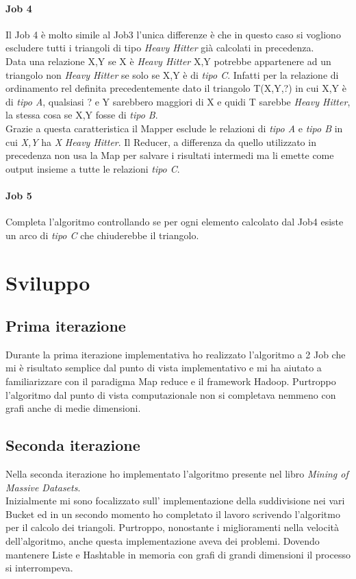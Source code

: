 \documentclass[paper=a4, fontsize=11pt]{scrartcl}	%
\numberwithin{equation}{section}															%
\numberwithin{figure}{section}																%
\numberwithin{table}{section}																%
\begin{document}
\paragraph{Job 4}
Il Job 4 è molto simile al Job3 l'unica differenze è che in questo caso si vogliono escludere tutti i triangoli di tipo \textit{Heavy Hitter} già calcolati in precedenza.\\
Data una relazione X,Y se X è \textit{Heavy Hitter} X,Y potrebbe appartenere ad un triangolo non \textit{Heavy Hitter} se solo se X,Y è di \textit{tipo C}. Infatti per la relazione di ordinamento rel definita precedentemente dato il triangolo T(X,Y,?) in cui X,Y è di \textit{tipo A}, qualsiasi ? e Y sarebbero maggiori di X e quidi T sarebbe \textit{Heavy Hitter}, la stessa cosa se X,Y fosse di \textit{tipo B}.\\
Grazie a questa caratteristica il Mapper esclude le relazioni di \textit{tipo A} e \textit{tipo B} in cui \textit{X,Y} ha \textit{X} \textit{Heavy Hitter}.
Il Reducer, a differenza da quello utilizzato in precedenza non usa la Map per salvare i risultati intermedi ma li emette come output insieme a tutte le relazioni \textit{tipo C}.
\paragraph{Job 5}
Completa l'algoritmo controllando se per ogni elemento calcolato dal Job4 esiste un arco di \textit{tipo C} che chiuderebbe il triangolo.
\section{Sviluppo}
\subsection{Prima iterazione} 
Durante la prima iterazione implementativa ho realizzato l'algoritmo a 2 Job che mi è risultato semplice dal punto di vista implementativo e mi ha aiutato a familiarizzare con il paradigma Map reduce e il framework Hadoop. Purtroppo l'algoritmo dal punto di vista computazionale non si completava nemmeno con grafi anche di medie dimensioni.
\subsection{Seconda iterazione} 
Nella seconda iterazione ho implementato l'algoritmo presente nel libro \textit{Mining of Massive Datasets}.\\
Inizialmente mi sono focalizzato sull' implementazione della suddivisione nei vari Bucket ed in un secondo momento ho completato il lavoro scrivendo l'algoritmo per il calcolo dei triangoli. Purtroppo, nonostante i miglioramenti nella velocità dell'algoritmo, anche questa implementazione aveva dei problemi. Dovendo mantenere Liste e Hashtable in memoria con grafi di grandi dimensioni il processo si interrompeva.
\end{document}

